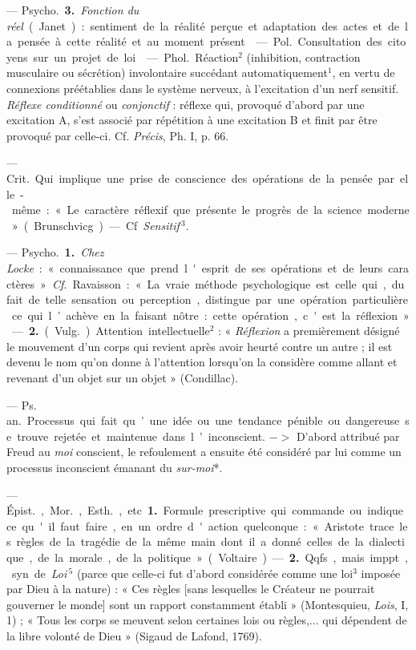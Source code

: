 \begin{itemize}[leftmargin=1cm, label=, itemsep=1pt]
— \si{Psycho.} {\bf 3.} {\it Fonction du réel} (Janet) : sentiment de la
réalité perçue et adaptation des actes et de la pensée à cette réalité et au
moment présent.

 — \si{Pol.} Consultation des citoyens sur un projet de loi.

 — \si{Phol.} Réaction$^2$ (inhibition, contraction musculaire ou
sécrétion) involontaire succédant automatiquement$^1$, en vertu de connexions
préétablies dans le système nerveux, à l'excitation d’un nerf sensitif. {\it
Réflexe conditionné} ou {\it conjonctif} : réflexe qui, provoqué d’abord par
une excitation A, s’est associé par répétition à une excitation B et finit
par être provoqué par celle-ci. Cf. {\it Précis}, Ph. I, p. 66.

 — \si{Crit.} Qui implique une prise de conscience des
opérations de la pensée par elle-même : « Le caractère réflexif que présente
le progrès de la science moderne » (Brunschvicg). — Cf. {\it Sensitif}$\, ^3$.

 — \si{Psycho.} {\bf 1.} {\it Chez Locke} : « connaissance que
prend l'esprit de ses opérations et de leurs caractères ». {\it Cf.}
Ravaisson : « La vraie méthode psychologique est celle qui, du fait de telle
sensation ou perception, distingue par une opération particulière ce qui
l’achève en la faisant nôtre : cette opération, c'est la réflexion. » —
{\bf 2.} (\si{Vulg.}) Attention intellectuelle$^2$ : « {\it Réflexion} a
premièrement désigné le mouvement d’un corps qui revient après avoir heurté
contre un autre ; il est devenu le nom qu'on donne à l'attention lorsqu'on la
considère comme allant et revenant d’un objet sur un objet » (Condillac).

 — \si{Ps. an.} Processus qui fait qu’une idée ou une
tendance pénible ou dangereuse se trouve rejetée et maintenue dans
l’inconscient. $->$ D'abord attribué par Freud au {\it moi} conscient, le
refoulement a ensuite été considéré par lui
comme un processus inconscient émanant du {\it sur-moi}*.

 — \si{Épist.}, \si{Mor.}, \si{Esth.}, etc. {\bf 1.} Formule
prescriptive qui commande ou indique ce qu'il faut faire, en un ordre
d'action quelconque : « Aristote trace les règles de la tragédie de la même
main dont il a donné celles de la dialectique, de la morale, de la politique
» (Voltaire). — {\bf 2.} Qqfs., mais imppt., syn. de {\it Loi}$\,^5$ (parce que
celle-ci fut d’abord considérée comme une loi$^3$ imposée par Dieu à la
nature) : « Ces règles [sans lesquelles le Créateur ne pourrait gouverner le
monde] sont un rapport constamment établi » (Montesquieu, {\it Lois}, I, 1) ;
« Tous les corps se meuvent selon certaines lois ou règles,... qui dépendent
de la libre volonté de Dieu » (Sigaud de Lafond, 1769).


\end{itemize}
